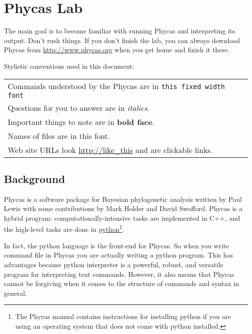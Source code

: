 \documentclass{article}
\newcommand{\cmd}[1]{\texttt{#1}\xspace}
\newcommand{\phycas}{Phycas\xspace}
\newcommand{\localfile}[1]{\textsf{#1}\xspace}
\begin{document}
\section{\phycas Lab}


The main goal is to become familiar with running \phycas and interpreting its output. 
Don't rush things. 
If you don't finish the lab, you can always download 
\phycas from \url{http://www.phycas.org} when you get home and finish it there.

Stylistic conventions used in this document:

\begin{tabular}{l}
	Commands understood by the \phycas are in \cmd{this fixed width font} \\
	Questions for you to answer are in {\em italics}. \\
	Important things to note are in {\bf bold face}. \\
	Names of files \localfile{are in  this font}.\\
	Web site URLs look \url{http://like_this} and are clickable links.
\end{tabular}

\subsection{Background}
\phycas is a software package for Bayesian phylogenetic analysis written by Paul Lewis with
some contributions by Mark Holder and David Swofford.
\phycas is a hybrid program: computationally-intensive tasks are implemented in C++, and the high-level
tasks are done in \href{http://www.python.org/}{python}\footnote{The Phycas manual contains instructions for installing python if you are using an operating system
that does not come with python installed.}.

In fact, the python language is the front-end for \phycas. 
So when you write command file in \phycas you are actually writing a python program.
This has advantages because python interpreter is a powerful, robust, and versatile program for interpreting text commands.
However, it also means that \phycas cannot be forgiving when it comes to the structure of commands and syntax in general.
\end{document}
